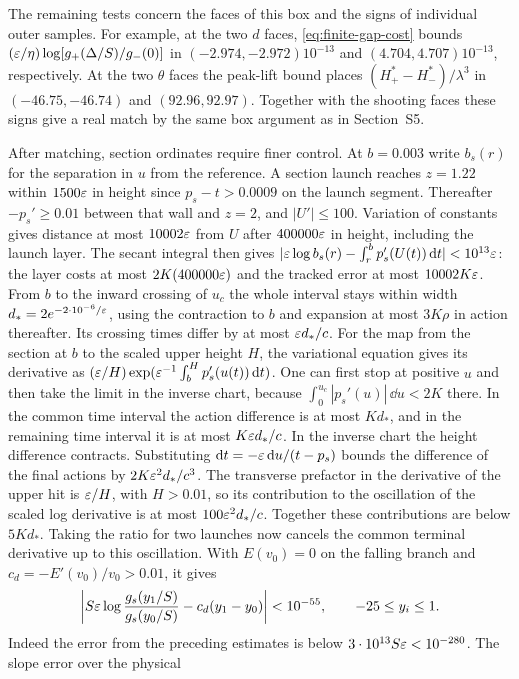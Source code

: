 The remaining tests concern the faces of this box and the signs of
individual outer samples. For example, at the two $d$ faces,
\eqref{eq:finite-gap-cost} bounds $(\varepsilon/\eta)\log[g_+(\Delta/S)/g_-(0)]$
in $(-2.974,-2.972)10^{-13}$ and $(4.704,4.707)10^{-13}$, respectively.
At the two $\theta$ faces the peak-lift bound places
$(H_+^*-H_-^*)/\lambda^3$ in $(-46.75,-46.74)$ and $(92.96,92.97)$.
Together with the shooting faces these signs give a real match by the
same box argument as in Section~S5.

After matching, section ordinates require finer control. At $b=0.003$
write $b_s(r)$ for the separation in $u$ from the reference. A section
launch reaches $z=1.22$ within $1500\varepsilon$ in height since
$p_s-t>0.0009$ on the launch segment. Thereafter
$-p_s'\ge0.01$ between that wall and $z=2$, and $|U'|\le100$.
Variation of constants gives distance at most $10002\varepsilon$ from $U$
after $400000\varepsilon$ in height, including the launch layer.
The secant integral then gives
$|\varepsilon\log b_s(r)-\int_r^b p_s'(U(t))\,\mathrm{d} t|<10^{13}\varepsilon$:
the layer costs at most $2K(400000\varepsilon)$ and the tracked error at
most $10002K\varepsilon$. From $b$ to the inward crossing of $u_c$ the
whole interval stays within width $d_*=2e^{-2\cdot10^{-6}/\varepsilon}$,
using the contraction to $b$ and expansion at most $3K\rho$ in action
thereafter. Its crossing times differ by at most $\varepsilon d_*/c$.
For the map from the section at $b$ to the scaled upper height $H$,
the variational equation gives its derivative as
$(\varepsilon/H)\exp(\varepsilon^{-1}\int_b^H p_s'(u(t))\,\mathrm{d} t)$.
One can first stop at positive $u$ and then take the limit in the
inverse chart, because $\int_0^{u_c}|p_s'(u)|\,\dd u<2K$ there.
In the common time interval the action difference is at most $Kd_*$,
and in the remaining time interval it is at most $K\varepsilon d_*/c$.
In the inverse chart the height difference contracts. Substituting
$\mathrm{d} t=-\varepsilon\,\mathrm{d} u/(t-p_s)$ bounds the difference of the final
actions by $2K\varepsilon^2d_*/c^3$. The transverse prefactor in the
derivative of the upper hit is $\varepsilon/H$, with $H>0.01$, so its
contribution to the oscillation of the scaled log derivative is at most
$100\varepsilon^2d_*/c$. Together these contributions are below $5Kd_*$.
Taking the ratio for two launches now cancels the common terminal
derivative up to this oscillation. With $E(v_0)=0$ on the falling
branch and $c_d=-E'(v_0)/v_0>0.01$, it gives
\[
 \left|S\varepsilon\log\frac{g_s(y_1/S)}{g_s(y_0/S)}
          -c_d(y_1-y_0)\right|<10^{-55},\qquad -25\le y_i\le1 .
\]
Indeed the error from the preceding estimates is below
$3\cdot10^{13}S\varepsilon<10^{-280}$. The slope error over the physical
